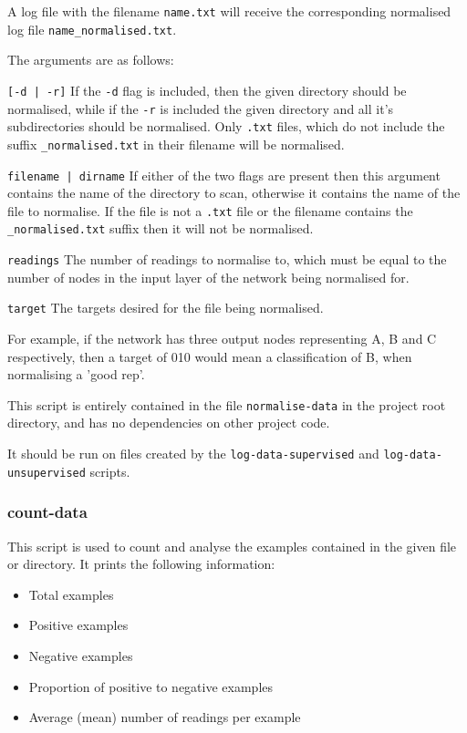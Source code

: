 \documentclass[a4paper]{article}
\begin{document}
A log file with the filename \lstinline{name.txt} will receive the corresponding normalised log file \lstinline{name_normalised.txt}.

The arguments are as follows:

\lstinline{[-d | -r]} If the \lstinline{-d} flag is included, then the given directory should be normalised, while if the \lstinline{-r} is included the given directory and all it's subdirectories should be normalised. Only \lstinline{.txt} files, which do not include the suffix \lstinline{_normalised.txt} in their filename will be normalised.

\lstinline{filename | dirname} If either of the two flags are present then this argument contains the name of the directory to scan, otherwise it contains the name of the file to normalise. If the file is not a \lstinline{.txt} file or the filename contains the \lstinline{_normalised.txt} suffix then it will not be normalised.

\lstinline{readings} The number of readings to normalise to, which must be equal to the number of nodes in the input layer of the network being normalised for.

\lstinline{target} The targets desired for the file being normalised.

For example, if the network has three output nodes representing A, B and C respectively, then a target of 010 would mean a classification of B, when normalising a 'good rep'.

This script is entirely contained in the file \lstinline{normalise-data} in the project root directory, and has no dependencies on other project code.

It should be run on files created by the \lstinline{log-data-supervised} and \lstinline{log-data-unsupervised} scripts.

\subsubsection{count-data}
\label{subsubsec:dc_csa_countdata}

This script is used to count and analyse the examples contained in the given file or directory. It prints the following information:

\begin{itemize}
\item Total examples
\item Positive examples
\item Negative examples
\item Proportion of positive to negative examples
\item Average (mean) number of readings per example
\end{itemize}
\end{document}
